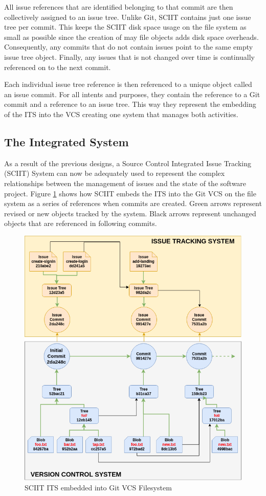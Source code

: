 \documentclass{mproj}
\begin{document}
All issue references that are identified belonging to that commit are then collectively assigned to an issue tree. Unlike Git, SCIIT contains just one issue tree per commit. This keeps the SCIIT disk space usage on the file system as small as possible since the creation of may file objects adds disk space overheads. Consequently, any commits that do not contain issues point to the same empty issue tree object. Finally, any issues that is not changed over time is continually referenced on to the next commit.

Each individual issue tree reference is then referenced to a unique object called an issue commit. For all intents and purposes, they contain the reference to a Git commit and a reference to an issue tree. This way they represent the embedding of the ITS into the VCS creating one system that manages both activities.


\subsection{The Integrated System}

As a result of the previous designs, a Source Control Integrated Issue Tracking (SCIIT) System can now be adequately used to represent the complex relationships between the management of issues and the state of the software project. Figure \ref{fig:sciit-filesystem} shows how SCIIT embeds the ITS into the Git VCS on the file system as a series of references when commits are created. Green arrows represent revised or new objects tracked by the system. Black arrows represent unchanged objects that are referenced in following commits.


\begin{figure}[h!]
\caption{SCIIT ITS embedded into Git VCS Filesystem}
\label{fig:sciit-filesystem}
\centering
\includegraphics[width=12cm]{sciit-filesystem}
\end{figure}
\end{document}
